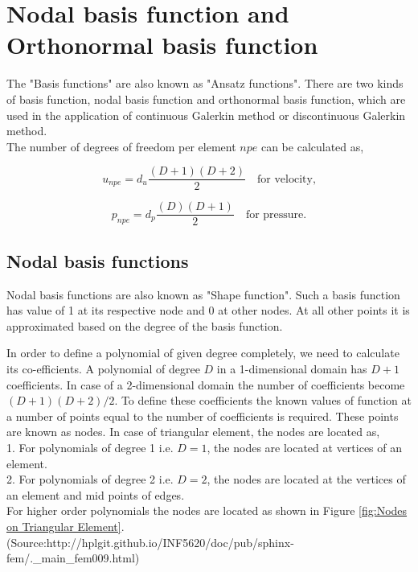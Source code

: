 \documentclass[a4paper,twoside,openright]{book}
\begin{document}
\section[Basis function]{Nodal basis function and Orthonormal basis function}

The "Basis functions" are also known as "Ansatz functions". There are two kinds of basis function, nodal basis function and orthonormal basis function, which are used in the application of continuous Galerkin method or discontinuous Galerkin method. \\

The number of degrees of freedom per element $npe$ can be calculated as,

\begin{equation} \label{unpe}
u_{npe} = d_u \frac{(D+1)(D+2)}{2} \quad \textrm{for velocity} \textrm{,}
\end{equation} 

\begin{equation} \label{pnpe}
p_{npe} = d_p \frac{(D)(D+1)}{2} \quad \textrm{for pressure} \textrm{.}
\end{equation} 


\subsection{Nodal basis functions}

Nodal basis functions are also known as "Shape function". Such a basis function has value of 1 at its respective node and 0 at other nodes. At all other points it is approximated based on the degree of the basis function. 

In order to define a polynomial of given degree completely, we need to calculate its co-efficients. A polynomial of degree $D$ in a 1-dimensional domain has $D+1$ coefficients. In case of a 2-dimensional domain the number of coefficients become $(D+1)(D+2)/2$. To define these coefficients the known values of function at a number of points equal to the number of coefficients is required. These points are known as nodes. In case of triangular element, the nodes are located as,\\
1. For polynomials of degree 1 i.e. $D=1$, the nodes are located at vertices of an element.\\
2. For polynomials of degree 2 i.e. $D=2$, the nodes are located at the vertices of an element and mid points of edges.\\

For higher order polynomials the nodes are located as shown in Figure \ref{fig:Nodes on Triangular Element}. (Source:http://hplgit.github.io/INF5620/doc/pub/sphinx-fem/.\_main\_fem009.html)  
\end{document}
